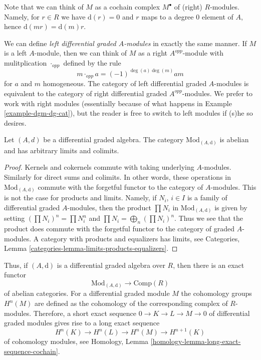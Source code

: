 \noindent
Note that we can think of $M$ as a cochain complex $M^\bullet$
of (right) $R$-modules. Namely, for $r \in R$ we have $\text{d}(r) = 0$
and $r$ maps to a degree $0$ element of $A$, hence
$\text{d}(mr) = \text{d}(m)r$.

\medskip\noindent
We can define {\it left differential graded $A$-modules} in exactly the same
manner. If $M$ is a left $A$-module, then we can think of $M$ as a
right $A^{opp}$-module with mulitplication $\cdot_{opp}$ defined by
the rule
$$
m \cdot_{opp} a = (-1)^{\deg(a)\deg(m)} a m
$$
for $a$ and $m$ homogeneous. The category of left differential graded
$A$-modules is equivalent to the category of right differential
graded $A^{opp}$-modules. We prefer to work with right modules
(essentially because of what happens in Example \ref{example-dgm-dg-cat}), but
the reader is free to switch to left modules if (s)he so desires.

\begin{lemma}
\label{lemma-dgm-abelian}
Let $(A, d)$ be a differential graded algebra. The category
$\text{Mod}_{(A, \text{d})}$ is abelian and has arbitrary limits and colimits.
\end{lemma}

\begin{proof}
Kernels and cokernels commute with taking underlying $A$-modules.
Similarly for direct sums and colimits. In other words, these operations
in $\text{Mod}_{(A, \text{d})}$ commute with the forgetful functor to the
category of $A$-modules. This is not the case for products and limits.
Namely, if $N_i$, $i \in I$ is a family of
differential graded $A$-modules, then the product $\prod N_i$ in
$\text{Mod}_{(A, \text{d})}$ is given by setting $(\prod N_i)^n = \prod N_i^n$
and $\prod N_i = \bigoplus_n (\prod N_i)^n$. Thus we see that the product
does commute with the forgetful functor to the category of graded $A$-modules.
A category with products and equalizers has limits, see
Categories, Lemma \ref{categories-lemma-limits-products-equalizers}.
\end{proof}

\noindent
Thus, if $(A, \text{d})$ is a differential graded
algebra over $R$, then there is an exact functor
$$
\text{Mod}_{(A, \text{d})} \longrightarrow \text{Comp}(R)
$$
of abelian categories. For a differential graded module $M$ the
cohomology groups $H^n(M)$ are defined as the cohomology of the
corresponding complex of $R$-modules. Therefore, a short exact
sequence $0 \to K \to L \to M \to 0$ of differential graded modules
gives rise to a long exact sequence
\begin{equation}
\label{equation-les}
H^n(K) \to H^n(L) \to H^n(M) \to H^{n + 1}(K)
\end{equation}
of cohomology modules, see
Homology, Lemma \ref{homology-lemma-long-exact-sequence-cochain}.

